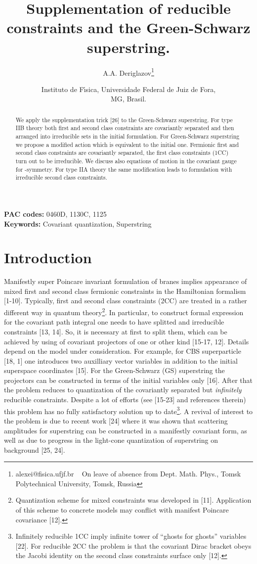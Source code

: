 \documentclass[a4paper]{article}
\title{Supplementation of reducible constraints 
and the Green-Schwarz superstring.}
\author{A.A. Deriglazov\thanks{alexei@fisica.ufjf.br ~ On leave of
absence from Dept. Math. Phys., Tomsk Polytechnical University,
Tomsk, Russia}}
\date{Instituto de F\'\i sica, Universidade Federal de Juiz de Fora,\\
MG, Brasil.}
\begin{document}
\maketitle
\large
\begin{abstract}
We apply the supplementation trick [26] to the Green-Schwarz superstring. 
For type IIB theory both first and second class
constraints are covariantly separated and then arranged into irreducible 
sets in the initial formulation.
For \coordHE{} Green-Schwarz superstring we propose a modified action 
which is equivalent to the initial one.    
Fermionic first and second class constraints are covariantly 
separated, the first class constraints (1CC) turn out to be irreducible. 
We discuss also equations of motion in the covariant gauge for 
\myHighlight{$\kappa$}\coordHE{}-symmetry.  
For type IIA theory the same modification leads to formulation with 
irreducible second class constraints.
\end{abstract}

{\bf PAC codes:} 0460D, 1130C, 1125 \\
{\bf Keywords:} Covariant quantization, Superstring \\

\noindent
\section{Introduction}
Manifestly super Poincare invariant formulation of branes implies 
appearance of mixed first and second class fermionic constraints 
in the Hamiltonian formalism [1-10]. Typically, 
first and second class constraints (2CC) are treated in a rather 
different way in quantum theory\footnote{Quantization scheme for mixed 
constraints was developed in [11]. Application of this scheme to concrete 
models may conflict with manifest Poincare covariance [12].}. In 
particular, to construct formal expression for the covariant path 
integral one needs to have splitted and irreducible constraints [13, 14]. 
So, it is necessary at first to split them, 
which can be achieved 
by using of covariant projectors of one or other kind [15-17, 12]. 
Details depend on the model under consideration. For example, for 
CBS superparticle [18, 1] one introduces two auxilliary vector 
variables in addition to the initial superspace coordinates [15]. 
For the Green-Schwarz (GS) superstring the projectors can be constructed 
in terms of the initial variables only [16]. After that the problem 
reduces to quantization of the covariantly separated but 
{\em infinitely} reducible constraints. Despite a lot of efforts 
(see [15-23] and references therein) this problem has no fully 
satisfactory solution up to date\footnote{Infinitely reducible 1CC 
imply infinite tower of ``ghosts for ghosts'' variables [22]. For 
reducible 2CC the problem is  
that the covariant Dirac bracket obeys the Jacobi identity 
on the second class constraints surface only [12].}. A revival of interest 
to the problem is due to recent work [24] where it was shown that 
scattering amplitudes for superstring can be constructed in a manifestly 
covariant form, as well as due to progress in the light-cone 
quantization of superstring on \coordHE{} background [25, 24].
\end{document}
